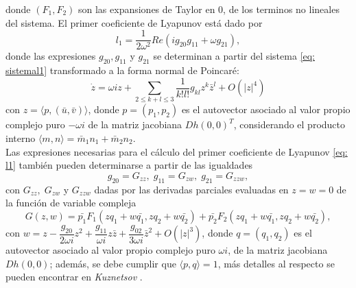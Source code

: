 donde $(F_1, F_2)$ son las expansiones de Taylor en 0, de los terminos no lineales del sistema. El primer coeficiente de Lyapunov está dado por
\begin{equation}
	l_1 = \dfrac{1}{2 \omega^2}Re(i g_{20}g_{11} + \omega g_{21}),
	\label{eq: l1}
\end{equation}
donde las expresiones $ g_{20}, g_{11}$ y $g_{21}$ se determinan a partir del sistema \eqref{eq: sistemal1} transformado a la forma normal de Poincaré:
\begin{equation}
	\dot{z} = \omega i z + \sum_{2 \le k+l \le 3} \dfrac{1}{k!l!} g_{kl} z^k \bar{z}^l + O(|z|^4)
	\label{eq: normalForm}
\end{equation}
con $z=\langle p,(\bar{u},\bar{v}) \rangle$, donde $p=(p_1,p_2)$ es el autovector asociado al valor propio complejo puro $-\omega i$ de la matriz jacobiana $Dh(0,0)^T$, considerando el producto interno $\langle m,n \rangle = \bar{m}_1 n_1 + \bar{m}_2 n_2$. \\

Las expresiones necesarias para el cálculo del primer coeficiente de Lyapunov \eqref{eq: l1} también pueden determinarse a partir de las igualdades
\begin{equation}
	g_{20}=G_{zz}, \; g_{11}=G_{zw}, \; g_{21}=G_{zzw},
	\label{eq: derFunComplejaL1}
\end{equation}
con $G_{z z}, \;G_{z w}$ y $G_{z z w}$ dadas por las derivadas parciales evaluadas en \linebreak $z=w=0$ de la función de variable compleja
\begin{equation}
	G(z,w) = \bar{p_1}F_1(zq_1+w\bar{q_1}, zq_2+w\bar{q_2}) + \bar{p_2}F_2(zq_1+w\bar{q_1}, zq_2+w\bar{q_2}),
	\label{eq: funComplejaL1}
\end{equation}
con $w = z - \dfrac{g_{20}}{2\omega i} z^2 + \dfrac{g_{11}}{\omega i} z \bar{z} + \dfrac{g_{02}}{3\omega i} \bar{z}^2 + O(|z|^3)$, donde $q=(q_1,q_2)$ es el autovector asociado al valor propio complejo puro $\omega i$, de la matriz jacobiana $Dh(0,0)$; además, se debe cumplir que $\langle p,q \rangle =1$, más detalles al respecto se pueden encontrar en \textit{Kuznetsov} \cite[p.  ~101]{Kuznetsov2023}. \\

